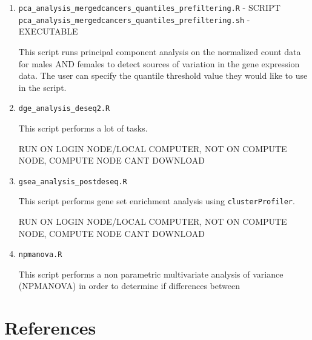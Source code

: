 \documentclass[10pt]{article}
\begin{document}
\begin{enumerate}
\item\texttt{pca\_analysis\_mergedcancers\_quantiles\_prefiltering.R} - SCRIPT\newline
\texttt{pca\_analysis\_mergedcancers\_quantiles\_prefiltering.sh} - EXECUTABLE

This script runs principal component analysis on the normalized count data for males AND females to detect sources of variation in the gene expression data. The user can specify the quantile threshold value they would like to use in the script.
	
\item\texttt{dge\_analysis\_deseq2.R}
	
This script performs a lot of tasks.

RUN ON LOGIN NODE/LOCAL COMPUTER, NOT ON COMPUTE NODE, COMPUTE NODE CANT DOWNLOAD
	
\item\texttt{gsea\_analysis\_postdeseq.R}
	
This script performs gene set enrichment analysis using \texttt{clusterProfiler}.

RUN ON LOGIN NODE/LOCAL COMPUTER, NOT ON COMPUTE NODE, COMPUTE NODE CANT DOWNLOAD
	
\item\texttt{npmanova.R}
	
This script performs a non parametric multivariate analysis of variance (NPMANOVA) in order to determine if differences between 
	
\end{enumerate}

\clearpage\newpage
\section{References}


\nocite{*}
\printbibliography[heading=none, sorting=nyt]
\newpage

%

%
\end{document}
